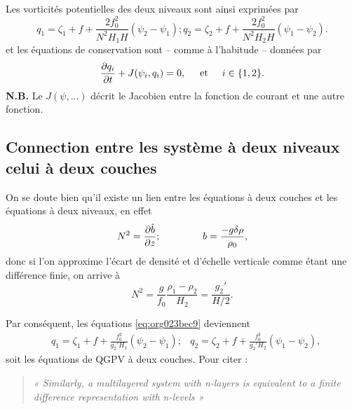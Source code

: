 \documentclass[10pt]{article}
\numberwithin{equation}{section}
\begin{document}
Les vorticités potentielles des deux niveaux sont ainsi exprimées par
\begin{subequations}
\label{eq:org023bec9}
\begin{equation}
q_1 = \zeta_1 + f + \frac{2 f_0^2}{N^2 H_1 H} (\psi_2 - \psi_1);
\end{equation}
\begin{equation}
q_2 = \zeta_2 + f + \frac{2 f_0^2}{N^2 H_2 H} (\psi_1 - \psi_2).
\end{equation}
\end{subequations}
et les équations de conservation sont -- comme à l'habitude -- données par
\begin{equation}
\pdv{q_i}{t} + J (\psi_i,q_i) = 0,
\hspace{0.5cm} \text{et} \hspace{0.5cm}
i \in \qty{1,2}.
\end{equation}
\textbf{N.B.} Le \(J(\psi,...)\) décrit le Jacobien entre la fonction de courant et une autre fonction.
\vspace{2cm}
\subsection{Connection entre les système à \textbf{deux niveaux} celui à \textbf{deux couches}}
\label{sec:org57a2598}
On se doute bien qu'il existe un lien entre les équations à deux couches et les équations à deux niveaux, en effet
\begin{equation}  
N^2 = \pdv{\hat{b}}{z}; \hspace{1.5cm} b = \frac{-g\delta \rho}{\rho_0},
\end{equation}
donc si l'on approxime l'écart de densité et d'échelle verticale comme étant une différence finie, on arrive à
\begin{equation}
N^2 = \frac{g}{f_0} \frac{\rho_1 - \rho_2}{H_2} = \frac{g_2'}{H/2}.
\end{equation}

Par conséquent, les équations \ref{eq:org023bec9} deviennent
\begin{align}
&q_1 = \zeta_1 + f + \frac{f_0^2}{g_2' H_1} (\psi_2 - \psi_1);
&q_2 = \zeta_2 + f + \frac{f_0^2}{g_2' H_2} (\psi_1 - \psi_2),
\end{align}
soit les équations de QGPV à deux couches.
Pour citer \autocite[p.195]{vallis_2006} :
\begin{quote}
\textit{« Similarly, a multilayered system with n-layers is equivalent to a finite difference representation with n-levels »}
\end{quote}
\end{document}
